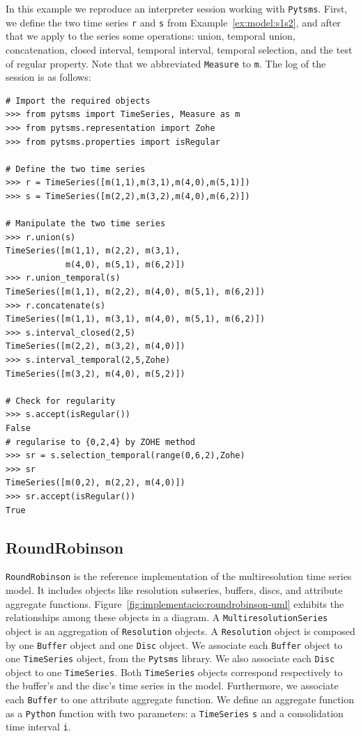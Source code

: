 \begin{example}
  \label{ex:pytsms:example}
  In this example we reproduce an interpreter session working with
  \texttt{Pytsms}. First, we define the two time series \texttt{r} and
  \texttt{s} from Example~\ref{ex:model:s1s2}, and after that we apply
  to the series some operations: union, temporal union, concatenation,
  closed interval, \zohe{} temporal interval, \zohe{} temporal
  selection, and the test of regular property. Note that we
  abbreviated \texttt{Measure} to \texttt{m}. The log of the session
  is as follows:

  {\small
\begin{verbatim}
# Import the required objects
>>> from pytsms import TimeSeries, Measure as m
>>> from pytsms.representation import Zohe
>>> from pytsms.properties import isRegular

# Define the two time series
>>> r = TimeSeries([m(1,1),m(3,1),m(4,0),m(5,1)])
>>> s = TimeSeries([m(2,2),m(3,2),m(4,0),m(6,2)])

# Manipulate the two time series
>>> r.union(s)
TimeSeries([m(1,1), m(2,2), m(3,1), 
            m(4,0), m(5,1), m(6,2)])
>>> r.union_temporal(s)
TimeSeries([m(1,1), m(2,2), m(4,0), m(5,1), m(6,2)])
>>> r.concatenate(s) 
TimeSeries([m(1,1), m(3,1), m(4,0), m(5,1), m(6,2)])
>>> s.interval_closed(2,5)
TimeSeries([m(2,2), m(3,2), m(4,0)])
>>> s.interval_temporal(2,5,Zohe)
TimeSeries([m(3,2), m(4,0), m(5,2)])

# Check for regularity
>>> s.accept(isRegular())
False
# regularise to {0,2,4} by ZOHE method
>>> sr = s.selection_temporal(range(0,6,2),Zohe)
>>> sr
TimeSeries([m(0,2), m(2,2), m(4,0)])
>>> sr.accept(isRegular())
True
\end{verbatim}
}
\end{example}





\subsection{RoundRobinson}

\texttt{RoundRobinson} is the reference implementation of the
multiresolution time series model. It includes objects like resolution
subseries, buffers, discs, and attribute aggregate
functions. Figure~\ref{fig:implementacio:roundrobinson-uml} exhibits
the relationships among these objects in a  diagram.  A
\texttt{MultiresolutionSeries} object is an aggregation of
\texttt{Resolution} objects. 
%
A \texttt{Resolution} object is composed by one \texttt{Buffer} object
and one \texttt{Disc} object. 
%
We associate each \texttt{Buffer} object to one \texttt{TimeSeries}
object, from the \texttt{Pytsms} library.
%
We also associate each \texttt{Disc} object to one \texttt{TimeSeries}.
%
Both \texttt{TimeSeries} objects correspond respectively to the buffer's and
the disc's time series in the  model.
%
Furthermore, we associate each \texttt{Buffer} to one attribute
aggregate function.  We define an aggregate function as a
\texttt{Python} function with two parameters: a \texttt{TimeSeries}
\texttt{s} and a consolidation time interval \texttt{i}.

